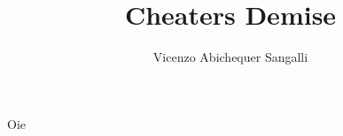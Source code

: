 \documentclass[10pt,a4paper]{article}
\author{Vicenzo Abichequer Sangalli}
\title{Cheaters Demise}
\begin{document}
Oie
\end{document}
